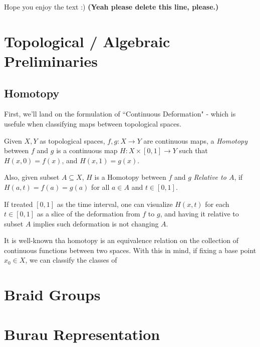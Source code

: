 \documentclass[x11names,reqno,12pt]{extarticle}
\begin{document}
Hope you enjoy the text :) \textbf{(Yeah please delete this line, please.)}

\section{Topological / Algebraic Preliminaries}
\subsection{Homotopy}
First, we'll land on the formulation of ``Continuous Deformation" - which is usefule when classifying maps between topological spaces.
\begin{defn}
  Given $X,Y$ as topological spaces, $f,g:X\rightarrow Y$ are continuous maps, a \emph{Homotopy} between $f$ and $g$ is a continuous map $H:X\times [0,1]\rightarrow Y$ such that $H(x,0)=f(x)$, and $H(x,1)=g(x)$.

  Also, given subset $A \subseteq X$, $H$ is a Homotopy between $f$ and $g$ \emph{Relative to $A$}, if $H(a,t) = f(a)=g(a)$ for all $a\in A$ and $t\in [0,1]$.
\end{defn}
If treated $[0,1]$ as the time interval, one can visualize $H(x,t)$ for each $t\in [0,1]$ as a slice of the deformation from $f$ to $g$, and having it relative to subset $A$ implies such deformation is not changing $A$. 

\hfil

It is well-known tha homotopy is an equivalence relation on the collection of continuous functions between two spaces. With this in mind, if fixing a base point $x_0 \in X$, we can classify the classes of 

\section{Braid Groups}

\section{Burau Representation}
\end{document}
